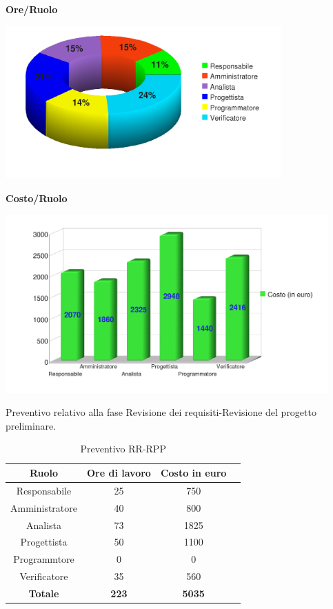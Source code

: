 \begin{center}\textbf{Ore/Ruolo}
\end{center}
\includegraphics[width=300pt]{OreTotali}
\newpage
\begin{center}\textbf{Costo/Ruolo}
\end{center}
\includegraphics[width=350pt]{CostiTotali}

Preventivo relativo alla fase Revisione dei requisiti-Revisione del progetto preliminare.
\begin{table}[h]
	\begin{center}
		  \begin{tabular}{|c|c|c|c|}
		 \hline 
		 \textbf{Ruolo} & \textbf{Ore di lavoro} & \textbf{Costo in euro}\\
		 \hline
		Responsabile & 25 & 750 \\
		Amministratore & 40 & 800\\
		Analista & 73 & 1825\\
		Progettista & 50 & 1100\\
		Programmtore & 0 & 0 \\
		Verificatore & 35 & 560\\
        \hline
        \textbf{Totale} & \textbf{223} & \textbf{5035}\\
		\hline
		\end{tabular}
	\caption{Preventivo RR-RPP} 
	\label{tab:tabella_RR-RPP}
	\end{center}	
\end{table}


